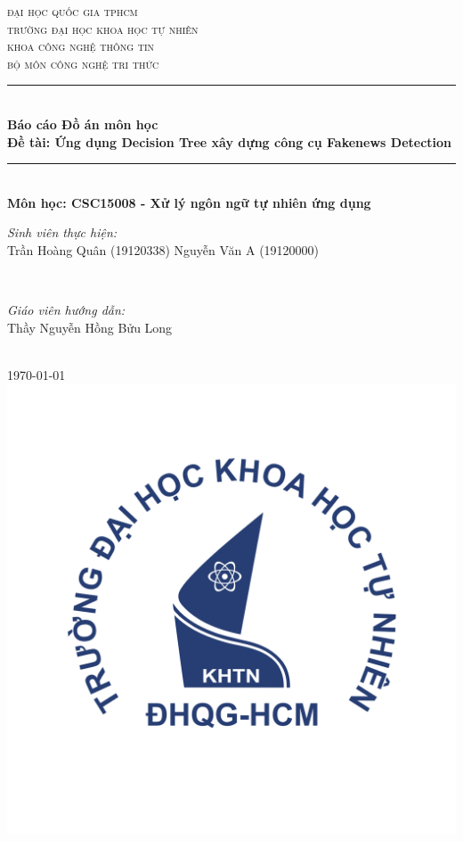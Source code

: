 \documentclass[12pt]{article}
\newcommand{\coursename}{CSC15008 - Xử lý ngôn ngữ tự nhiên ứng dụng}
\newcommand{\reportname}{Ứng dụng Decision Tree xây dựng công cụ Fakenews Detection}
\begin{document}
\begin{titlepage}
\newcommand{\HRule}{\rule{\linewidth}{0.5mm}}
\centering

\textsc{\LARGE đại học quốc gia tphcm}\\[1.5cm]
\textsc{\Large trường đại học khoa học tự nhiên}\\[0.5cm]
\textsc{\large khoa công nghệ thông tin}\\[0.5cm]
\textsc{bộ môn công nghệ tri thức}\\[0.5cm]

\HRule \\[0.4cm]
{ 
\huge{\bfseries{Báo cáo Đồ án môn học}}\\[0.5cm]
\large{\bfseries{Đề tài: \reportname}}
}\\[0.4cm]
\HRule \\[0.5cm]

\textbf{\large Môn học: \coursename}\\[0.5cm]

\begin{minipage}{0.4\textwidth}
\begin{flushleft} \large
\emph{Sinh viên thực hiện:}\\
Trần Hoàng Quân (19120338)
Nguyễn Văn A \textsc{(19120000)}
\end{flushleft}
\end{minipage}
~
\begin{minipage}{0.4\textwidth}
\begin{flushright} \large
\emph{Giáo viên hướng dẫn:} \\
Thầy Nguyễn Hồng Bửu Long
\end{flushright}
\end{minipage}\\[2cm]

{\large \today}\\[2cm]

\includegraphics[scale=.25]{img/hcmus-logo.png}\\[1cm] 


\end{titlepage}
\end{document}
